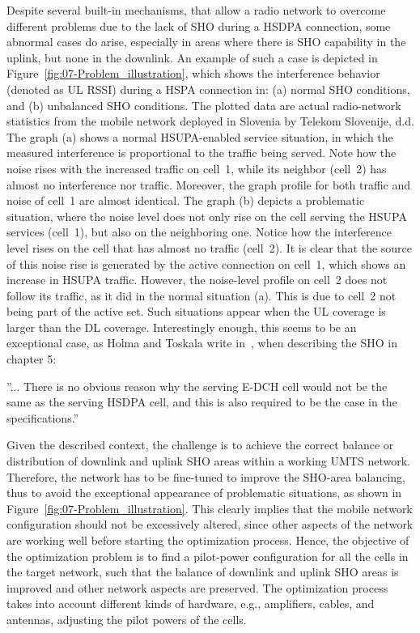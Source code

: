 Despite several built-in mechanisms, that allow a radio network to
overcome different problems due to the lack of SHO during a HSDPA
connection, some abnormal cases do arise, especially in areas where
there is SHO capability in the uplink, but none in the downlink. An
example of such a case is depicted in Figure~\ref{fig:07-Problem_illustration},
which shows the interference behavior (denoted as UL RSSI) during
a HSPA connection in: (a) normal SHO conditions, and (b) unbalanced
SHO conditions. The plotted data are actual radio-network statistics
from the mobile network deployed in Slovenia by Telekom Slovenije,
d.d. The graph (a) shows a normal HSUPA-enabled service situation,
in which the measured interference is proportional to the traffic
being served. Note how the noise rises with the increased traffic
on cell~1, while its neighbor (cell~2) has almost no interference
nor traffic. Moreover, the graph profile for both traffic and noise
of cell~1 are almost identical. The graph (b) depicts a problematic
situation, where the noise level does not only rise on the cell serving
the HSUPA services (cell~1), but also on the neighboring one. Notice
how the interference level rises on the cell that has almost no traffic
(cell~2). It is clear that the source of this noise rise is generated
by the active connection on cell~1, which shows an increase in HSUPA
traffic. However, the noise-level profile on cell~2 does not follow
its traffic, as it did in the normal situation (a). This is due to
cell~2 not being part of the active set. Such situations appear when
the UL coverage is larger than the DL coverage. Interestingly enough,
this seems to be an exceptional case, as Holma and Toskala write in~\cite{holma2006hsdpa},
when describing the SHO in chapter 5:

''... There is no obvious reason why the serving E-DCH cell would
not be the same as the serving HSDPA cell, and this is also required
to be the case in the specifications.''

Given the described context, the challenge is to achieve the correct
balance or distribution of downlink and uplink SHO areas within a
working UMTS network. Therefore, the network has to be fine-tuned
to improve the SHO-area balancing, thus to avoid the exceptional appearance
of problematic situations, as shown in Figure~\ref{fig:07-Problem_illustration}.
This clearly implies that the mobile network configuration should
not be excessively altered, since other aspects of the network are
working well before starting the optimization process. Hence, the
objective of the optimization problem is to find a pilot-power configuration
for all the cells in the target network, such that the balance of
downlink and uplink SHO areas is improved and other network aspects
are preserved. The optimization process takes into account different
kinds of hardware, e.g., amplifiers, cables, and antennas, adjusting
the pilot powers of the cells.

